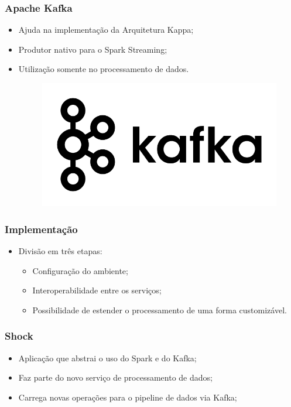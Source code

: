 \documentclass{beamer}
\begin{document}
  \begin{frame}
      \frametitle{Apache Kafka}
      \begin{itemize}
          \item Ajuda na implementação da Arquitetura Kappa;
          \item Produtor nativo para o Spark Streaming;
          \item Utilização somente no processamento de dados.
              \begin{figure}
                  \includegraphics[scale=0.3]{figures/kafka_logo.png}
              \end{figure}
      \end{itemize}
  \end{frame}

  \begin{frame}
      \frametitle{Implementação}
      \begin{itemize}
          \item Divisão em três etapas:
              \begin{itemize}
                  \item Configuração do ambiente;
                  \item Interoperabilidade entre os serviços;
                  \item Possibilidade de estender o processamento de uma forma customizável.
              \end{itemize}
      \end{itemize}
  \end{frame}

  \begin{frame}
      \frametitle{Shock}
      \begin{itemize}
          \item Aplicação que abstrai o uso do Spark e do Kafka;
          \item Faz parte do novo serviço de processamento de dados;
          \item Carrega novas operações para o pipeline de dados via Kafka;
      \end{itemize}
  \end{frame}
\end{document}
